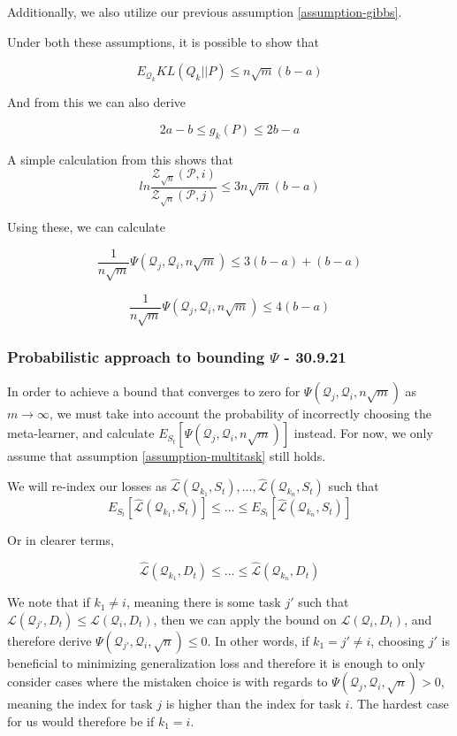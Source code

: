 \documentclass[letterpaper]{article}
\theoremstyle{definition}
\begin{document}
Additionally, we also utilize our previous assumption \ref{assumption-gibbs}.

Under both these assumptions, it is possible to show that 

$$E_{\mathcal{Q}_k} KL(Q_k||P)\leq n\sqrt{m} (b-a)$$

And from this we can also derive

$$2a-b\leq g_k(P) \leq 2b-a$$

A simple calculation from this shows that $$ln\frac{\mathcal{Z}_{\sqrt{n}}(\mathcal{P}, i)}{\mathcal{Z}_{\sqrt{n}}(\mathcal{P}, j)} \leq 3n\sqrt{m}(b-a)$$

Using these, we can calculate

$$\frac{1}{n\sqrt{m}}\Psi(\mathcal{Q}_j, \mathcal{Q}_i, n\sqrt{m})\leq 3(b-a)  + (b-a)$$ 

$$\frac{1}{n\sqrt{m}}\Psi(\mathcal{Q}_j, \mathcal{Q}_i, n\sqrt{m})\leq 4(b-a)$$ 


\subsubsection{Probabilistic approach to bounding $\Psi$ - 30.9.21}

In order to achieve a bound that converges to zero for $\Psi(\mathcal{Q}_j, \mathcal{Q}_i, n\sqrt{m})$ as $m\rightarrow\infty$, we must take into account the probability of incorrectly choosing the meta-learner, and calculate $E_{S_t} \left [\Psi(\mathcal{Q}_j, \mathcal{Q}_i, n\sqrt{m}) \right ]$ instead. For now, we only assume that assumption \ref{assumption-multitask} still holds.

We will re-index our losses as $\hat{\mathcal{L}}(\mathcal{Q}_{k_1}, S_t), ..., \hat{\mathcal{L}}(\mathcal{Q}_{k_n}, S_t)$ such that $$E_{S_t}\left [\hat{\mathcal{L}}(\mathcal{Q}_{k_1}, S_t)\right ]\leq ... \leq E_{S_t}\left [\hat{\mathcal{L}}(\mathcal{Q}_{k_n}, S_t)\right ]$$

Or in clearer terms,

$$\hat{\mathcal{L}}(\mathcal{Q}_{k_1}, D_t)\leq ... \leq \hat{\mathcal{L}}(\mathcal{Q}_{k_n}, D_t)$$

We note that if $k_1\neq i$, meaning there is some task $j'$ such that $\mathcal{L}(\mathcal{Q}_{j'}, D_t)\leq \mathcal{L}(\mathcal{Q}_{i}, D_t)$, then we can apply the bound on $\mathcal{L}(\mathcal{Q}_{i}, D_t)$, and therefore derive $\Psi(\mathcal{Q}_{j'}, \mathcal{Q}_i, \sqrt{n})\leq 0$.
In other words, if $k_1=j'\neq i$, choosing $j'$ is beneficial to minimizing generalization loss and therefore it is enough to only consider cases where the mistaken choice is with regards to $\Psi(\mathcal{Q}_{j}, \mathcal{Q}_i, \sqrt{n})> 0$, meaning the index for task $j$ is higher than the index for task $i$. The hardest case for us would therefore be if $k_1=i$.
\end{document}
